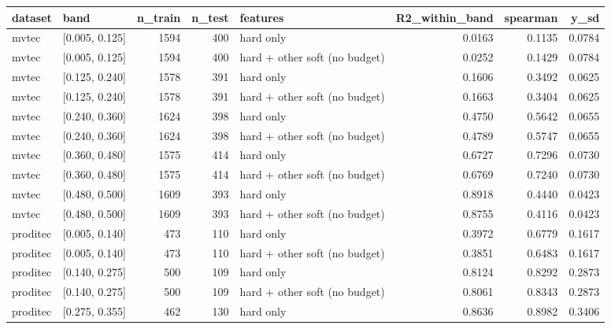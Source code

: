 \begin{tabular}{llrrlrrr}
\toprule
 dataset &           band &  n\_train &  n\_test &                      features &  R2\_within\_band &  spearman &   y\_sd \\
\midrule
   mvtec & [0.005, 0.125] &     1594 &     400 &                     hard only &          0.0163 &    0.1135 & 0.0784 \\
   mvtec & [0.005, 0.125] &     1594 &     400 & hard + other soft (no budget) &          0.0252 &    0.1429 & 0.0784 \\
   mvtec & [0.125, 0.240] &     1578 &     391 &                     hard only &          0.1606 &    0.3492 & 0.0625 \\
   mvtec & [0.125, 0.240] &     1578 &     391 & hard + other soft (no budget) &          0.1663 &    0.3404 & 0.0625 \\
   mvtec & [0.240, 0.360] &     1624 &     398 &                     hard only &          0.4750 &    0.5642 & 0.0655 \\
   mvtec & [0.240, 0.360] &     1624 &     398 & hard + other soft (no budget) &          0.4789 &    0.5747 & 0.0655 \\
   mvtec & [0.360, 0.480] &     1575 &     414 &                     hard only &          0.6727 &    0.7296 & 0.0730 \\
   mvtec & [0.360, 0.480] &     1575 &     414 & hard + other soft (no budget) &          0.6769 &    0.7240 & 0.0730 \\
   mvtec & [0.480, 0.500] &     1609 &     393 &                     hard only &          0.8918 &    0.4440 & 0.0423 \\
   mvtec & [0.480, 0.500] &     1609 &     393 & hard + other soft (no budget) &          0.8755 &    0.4116 & 0.0423 \\
proditec & [0.005, 0.140] &      473 &     110 &                     hard only &          0.3972 &    0.6779 & 0.1617 \\
proditec & [0.005, 0.140] &      473 &     110 & hard + other soft (no budget) &          0.3851 &    0.6483 & 0.1617 \\
proditec & [0.140, 0.275] &      500 &     109 &                     hard only &          0.8124 &    0.8292 & 0.2873 \\
proditec & [0.140, 0.275] &      500 &     109 & hard + other soft (no budget) &          0.8061 &    0.8343 & 0.2873 \\
proditec & [0.275, 0.355] &      462 &     130 &                     hard only &          0.8636 &    0.8982 & 0.3406 \\

\end{tabular}
